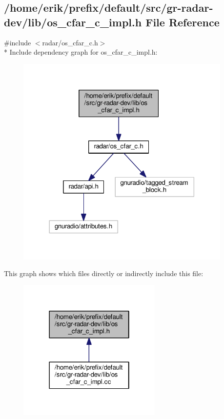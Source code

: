 \subsection{/home/erik/prefix/default/src/gr-\/radar-\/dev/lib/os\+\_\+cfar\+\_\+c\+\_\+impl.h File Reference}
\label{os__cfar__c__impl_8h}
{\ttfamily \#include $<$radar/os\+\_\+cfar\+\_\+c.\+h$>$}\\*
Include dependency graph for os\+\_\+cfar\+\_\+c\+\_\+impl.\+h\+:
\nopagebreak
\begin{figure}[H]
\begin{center}
\leavevmode
\includegraphics[width=302pt]{dd/d60/os__cfar__c__impl_8h__incl}
\end{center}
\end{figure}
This graph shows which files directly or indirectly include this file\+:
\nopagebreak
\begin{figure}[H]
\begin{center}
\leavevmode
\includegraphics[width=202pt]{df/da9/os__cfar__c__impl_8h__dep__incl}
\end{center}
\end{figure}
